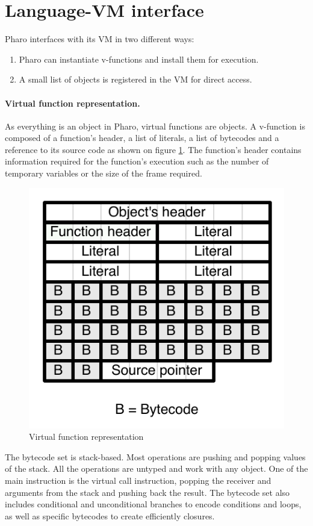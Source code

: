 \documentclass[a4paper,12pt,twoside]{../includes/ThesisStyle}
\begin{document}

\section{Language-VM interface}

Pharo interfaces with its VM in two different ways:
\begin{enumerate}
	\item Pharo can instantiate v-functions and install them for execution.
	\item A small list of objects is registered in the VM for direct access.
\end{enumerate}

\paragraph{Virtual function representation.}

As everything is an object in Pharo, virtual functions are objects. A v-function is composed of a function's header, a list of literals, a list of bytecodes and a reference to its source code as shown on figure \ref{fig:CompiledCode}. The function's header contains information required for the function's execution such as the number of temporary variables or the size of the frame required.

\begin{figure}[h!]
    \begin{center}
        \includegraphics[width=0.38\linewidth]{CompiledCode}
        \caption{Virtual function representation}
        \label{fig:CompiledCode}
    \end{center}
\end{figure}

The bytecode set is stack-based. Most operations are pushing and popping values of the stack. All the operations are untyped and work with any object. One of the main instruction is the virtual call instruction, popping the receiver and arguments from the stack and pushing back the result. The bytecode set also includes conditional and unconditional branches to encode conditions and loops, as well as specific bytecodes to create efficiently closures.
\end{document}
